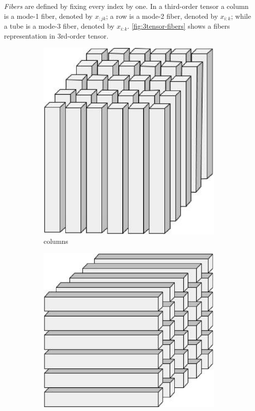 \documentclass[letterpaper,12pt]{article}
\begin{document}
\textit{Fibers} are defined by fixing every index by one. In a third-order tensor a column is a mode-1 fiber, denoted by $x_{:jk}$; a row is a mode-2 fiber, denoted by $x_{i:k}$; while a tube is a mode-3 fiber, denoted by $x_{i:k}$. \ref{fig:3tensor-fibers} shows a fibers representation in 3rd-order tensor.

\begin{figure}[!ht]
 \centering
 \begin{subfigure}[b]{0.29\textwidth}
  \includegraphics[width=\textwidth]{Images/3rd-order-tensor-fiber_mode-1.eps}
  \caption{columns}\label{fig:3tensor-columns}
 \end{subfigure}
 \begin{subfigure}[b]{0.33\textwidth}
  \includegraphics[width=\textwidth]{Images/3rd-order-tensor-fiber_mode-2.eps}

\end{subfigure}
\end{figure}
\end{document}
